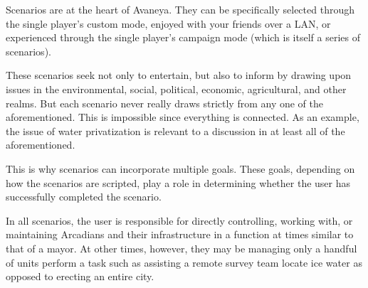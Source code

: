 

Scenarios are at the heart of Avaneya. They can be specifically selected through the single player's custom mode, enjoyed with your friends over a LAN, or experienced through the single player's campaign mode (which is itself a series of scenarios). 

These scenarios seek not only to entertain, but also to inform by drawing upon issues in the environmental, social, political, economic, agricultural, and other realms. But each scenario never really draws strictly from any one of the aforementioned. This is impossible since everything is connected. As an example, the issue of water privatization is relevant to a discussion in at least all of the aforementioned. 

This is why scenarios can incorporate multiple goals. These goals, depending on how the scenarios are scripted, play a role in determining whether the user has successfully completed the scenario.

In all scenarios, the user is responsible for directly controlling, working with, or maintaining Arcadians and their infrastructure in a function at times similar to that of a mayor. At other times, however, they may be managing only a handful of units perform a task such as assisting a remote survey team locate ice water as opposed to erecting an entire city.

